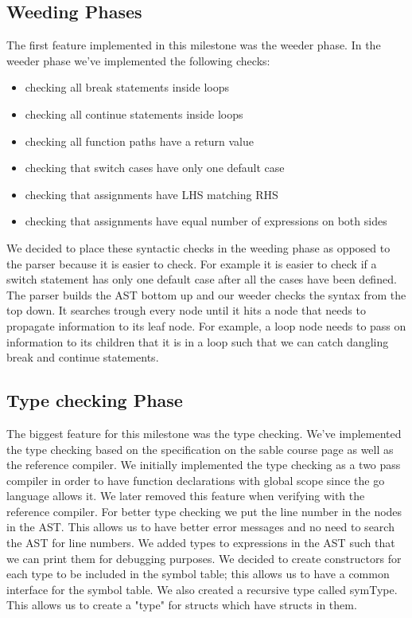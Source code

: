 \documentclass{article}
\begin{document}
\subsection{Weeding Phases}
The first feature implemented in this milestone was the weeder phase. In the weeder phase we've implemented the following checks:
\begin{itemize}
\item checking all break statements inside loops
\item checking all continue statements inside loops
\item checking all function paths have a return value
\item checking that switch cases have only one default case
\item checking that assignments have LHS matching RHS
\item checking that assignments have equal number of expressions on both sides
\end{itemize}

We decided to place these syntactic checks in the weeding phase as opposed to the parser because it is easier to check. For example it is easier to check if  a switch statement has only one default case after all the cases have been defined. The parser builds the AST bottom up and our weeder checks the syntax from the top down. It searches trough every node until it hits a node that needs to propagate information to its leaf node. For example, a loop node needs to pass on information to its children that it is in a loop such that we can catch dangling break and continue statements. 

\subsection{Type checking Phase}
The biggest feature for this milestone was the type checking. We've implemented the type checking based on the specification on the sable course page as well as the reference compiler. We initially implemented the type checking as a two pass compiler in order to have function declarations with global scope since the go language allows it. We later removed this feature when verifying with the reference compiler. For better type checking we put the line number in the nodes in the AST. This allows us to have better error messages and no need to search the AST for line numbers.  We added types to expressions in the AST such that we can print them for debugging purposes. We decided to create constructors for each type to be included in the symbol table; this allows us to have a common interface for the symbol table. We also created a recursive type called symType. This allows us to create a "type" for structs which have structs in them.
\end{document}
